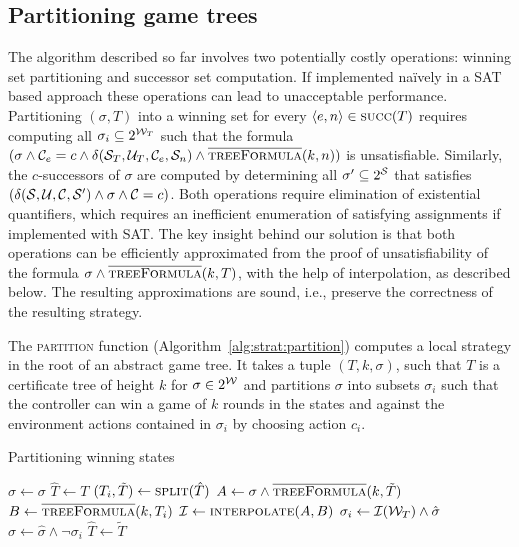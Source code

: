 \subsection{Partitioning game trees}

The algorithm described so far involves two potentially costly operations: winning set partitioning and successor set computation.  If implemented na\"ively in a SAT based approach these operations can lead to unacceptable performance.  Partitioning $(\sigma, T)$ into a winning set for every $\langle e, n \rangle \in \textsc{succ}(T)$ requires computing all $\sigma_i \subseteq 2^{\mathcal{W}_T}$ such that the formula $(\sigma \land \mathcal{C}_e = c \land \delta(\mathcal{S}_T, \mathcal{U}_T, \mathcal{C}_e, \mathcal{S}_n) \land \textsc{$\overline{\mbox{treeFormula}}$}(k, n))$ is unsatisfiable.  Similarly, the $c$-successors of $\sigma$ are computed by determining all $\sigma' \subseteq 2^{\mathcal{S}}$ that satisfies $(\delta(\mathcal{S}, \mathcal{U}, \mathcal{C}, \mathcal{S}') \land \sigma \land \mathcal{C} = c)$. Both operations require elimination of existential quantifiers, which requires an inefficient enumeration of satisfying assignments if implemented with SAT.  The key insight behind our solution is that both operations can be efficiently approximated from the proof of unsatisfiability of the formula $\sigma \land \textsc{$\overline{\mbox{treeFormula}}$}(k, T)$, with the help of interpolation, as described below.  The resulting approximations are sound, i.e., preserve the correctness of the resulting strategy.

The \textsc{partition} function (Algorithm~\ref{alg:strat:partition}) computes a local strategy in the root of an abstract game tree.  It takes a tuple $(T, k, \sigma)$, such that $T$ is a certificate tree of height $k$ for $\sigma \in 2^{\mathcal{W}}$ and partitions $\sigma$ into subsets $\sigma_i$ such that the controller can win a game of $k$ rounds in the states and against the environment actions contained in $\sigma_i$ by choosing action $c_i$.

\begin{algorithm}[t]
   \caption{Partitioning winning states}\label{alg:strat:partition}
   \begin{algorithmic}[1]
        \State $\hat{\sigma} \gets \sigma$
        \State $\hat{T} \gets T$
        \State $(T_i, \tilde{T}) \gets \Call{split}{\hat{T}}$\label{alg:partition:split}
            \State $A \gets \sigma \land \Call{\opptf}{k, \tilde{T}} $ \label{alg:strat:partition:Bi}
            \State $B \gets \Call{\opptf}{k, T_i} $ \label{alg:strat:partition:Ai}
            \State $\mathcal{I} \gets \Call{interpolate}{A, B}$\label{alg:partition:I}
            \State $\sigma_i \gets \mathcal{I}(\mathcal{W}_T) \land \hat{\sigma}$\label{alg:partition:Ii}
            \State $\hat{\sigma} \gets \hat{\sigma} \land \neg \sigma_i$
            \State $\hat{T} \gets \tilde{T}$\label{alg:partition:upd}
        \EndFor
        \State {} \label{alg:strat:partition:return}
        \EndFunction
    \end{algorithmic}
\end{algorithm}

